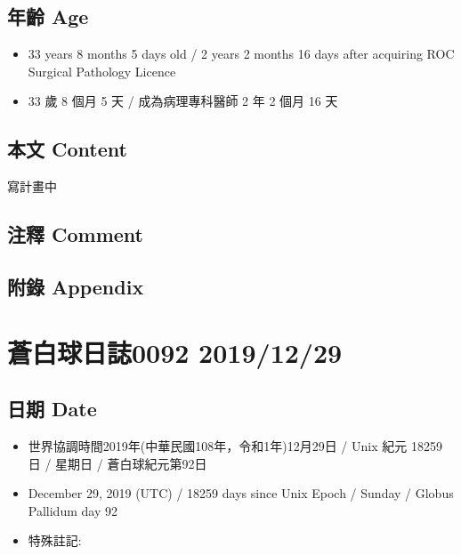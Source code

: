 \documentclass[
]{article}
\providecommand{\tightlist}{%
  \setlength{\itemsep}{0pt}\setlength{\parskip}{0pt}}
\begin{document}
\hypertarget{ux5e74ux9f61-age-27}{%
\subsection{年齡 Age}\label{ux5e74ux9f61-age-27}}

\begin{itemize}
\tightlist
\item
  33 years 8 months 5 days old / 2 years 2 months 16 days after
  acquiring ROC Surgical Pathology Licence
\item
  33 歲 8 個月 5 天 / 成為病理專科醫師 2 年 2 個月 16 天
\end{itemize}

\hypertarget{ux672cux6587-content-27}{%
\subsection{本文 Content}\label{ux672cux6587-content-27}}

寫計畫中

\hypertarget{ux6ce8ux91cb-comment-26}{%
\subsection{注釋 Comment}\label{ux6ce8ux91cb-comment-26}}

\hypertarget{ux9644ux9304-appendix-27}{%
\subsection{附錄 Appendix}\label{ux9644ux9304-appendix-27}}

\hypertarget{ux84bcux767dux7403ux65e5ux8a8c0092-20191229}{%
\section{蒼白球日誌0092
2019/12/29}\label{ux84bcux767dux7403ux65e5ux8a8c0092-20191229}}

\hypertarget{ux65e5ux671f-date-28}{%
\subsection{日期 Date}\label{ux65e5ux671f-date-28}}

\begin{itemize}
\tightlist
\item
  世界協調時間2019年(中華民國108年，令和1年)12月29日 / Unix 紀元 18259
  日 / 星期日 / 蒼白球紀元第92日
\item
  December 29, 2019 (UTC) / 18259 days since Unix Epoch / Sunday /
  Globus Pallidum day 92
\item
  特殊註記:
\end{itemize}
\end{document}
